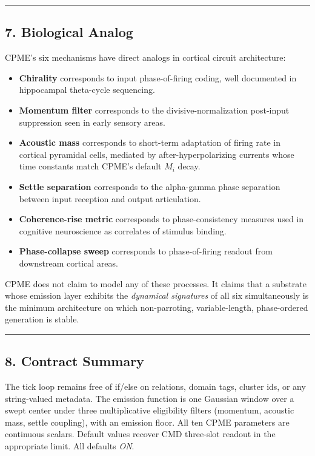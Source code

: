 \documentclass[
  11pt,
  a4paper,
]{article}
\providecommand{\tightlist}{%
  \setlength{\itemsep}{0pt}\setlength{\parskip}{0pt}}
\begin{document}
\begin{center}\rule{0.5\linewidth}{0.5pt}\end{center}

\subsection{7. Biological Analog}\label{biological-analog}

CPME's six mechanisms have direct analogs in cortical circuit
architecture:

\begin{itemize}
\tightlist
\item
  \textbf{Chirality} corresponds to input phase-of-firing coding, well
  documented in hippocampal theta-cycle sequencing.
\item
  \textbf{Momentum filter} corresponds to the divisive-normalization
  post-input suppression seen in early sensory areas.
\item
  \textbf{Acoustic mass} corresponds to short-term adaptation of firing
  rate in cortical pyramidal cells, mediated by after-hyperpolarizing
  currents whose time constants match CPME's default \(M_i\) decay.
\item
  \textbf{Settle separation} corresponds to the alpha-gamma phase
  separation between input reception and output articulation.
\item
  \textbf{Coherence-rise metric} corresponds to phase-consistency
  measures used in cognitive neuroscience as correlates of stimulus
  binding.
\item
  \textbf{Phase-collapse sweep} corresponds to phase-of-firing readout
  from downstream cortical areas.
\end{itemize}

CPME does not claim to model any of these processes. It claims that a
substrate whose emission layer exhibits the \emph{dynamical signatures}
of all six simultaneously is the minimum architecture on which
non-parroting, variable-length, phase-ordered generation is stable.

\begin{center}\rule{0.5\linewidth}{0.5pt}\end{center}

\subsection{8. Contract Summary}\label{contract-summary}

The tick loop remains free of if/else on relations, domain tags, cluster
ids, or any string-valued metadata. The emission function is one
Gaussian window over a swept center under three multiplicative
eligibility filters (momentum, acoustic mass, settle coupling), with an
emission floor. All ten CPME parameters are continuous scalars. Default
values recover CMD three-slot readout in the appropriate limit. All
defaults \emph{ON}.
\end{document}
